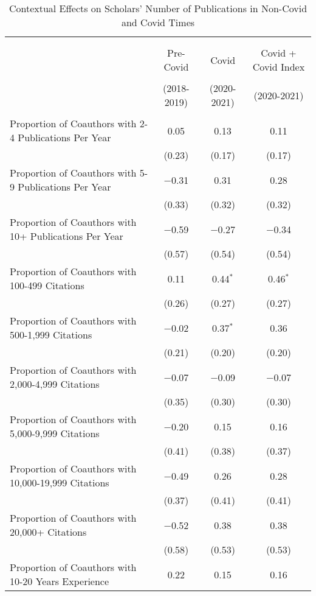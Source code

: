 \begin{table}[!htbp] \centering 
  \caption{Contextual Effects on Scholars' Number of Publications in Non-Covid and Covid Times} 
  \setlength\tabcolsep{1pt}
\begin{tabular}{lccc} 
\\[-1.8ex]\hline \hline \\[-1.8ex] 
\\[-1.8ex] & \multicolumn{1}{c}{Pre-Covid} & \multicolumn{1}{c}{Covid} & \multicolumn{1}{c}{Covid + Covid Index} \\ 
\\[-1.8ex] & (2018-2019) & (2020-2021) & (2020-2021) \\ 
\hline \\[-1.8ex]
  Proportion of Coauthors with 2-4 Publications Per Year & 0.05 & 0.13 & 0.11 \\ 
  & (0.23) & (0.17) & (0.17) \\
  Proportion of Coauthors with 5-9 Publications Per Year & $-$0.31 & 0.31 & 0.28 \\ 
  & (0.33) & (0.32) & (0.32) \\
  Proportion of Coauthors with 10+ Publications Per Year & $-$0.59 & $-$0.27 & $-$0.34 \\ 
  & (0.57) & (0.54) & (0.54) \\
  Proportion of Coauthors with 100-499 Citations & 0.11 & 0.44$^{*}$ & 0.46$^{*}$ \\ 
  & (0.26) & (0.27) & (0.27) \\
  Proportion of Coauthors with 500-1,999 Citations & $-$0.02 & 0.37$^{*}$ & 0.36 \\ 
  & (0.21) & (0.20) & (0.20) \\
  Proportion of Coauthors with 2,000-4,999 Citations & $-$0.07 & $-$0.09 & $-$0.07 \\ 
  & (0.35) & (0.30) & (0.30) \\
  Proportion of Coauthors with 5,000-9,999 Citations & $-$0.20 & 0.15 & 0.16 \\ 
  & (0.41) & (0.38) & (0.37) \\
  Proportion of Coauthors with 10,000-19,999 Citations & $-$0.49 & 0.26 & 0.28 \\ 
  & (0.37) & (0.41) & (0.41) \\
  Proportion of Coauthors with 20,000+ Citations & $-$0.52 & 0.38 & 0.38 \\ 
  & (0.58) & (0.53) & (0.53) \\
  Proportion of Coauthors with 10-20 Years Experience & 0.22 & 0.15 & 0.16 \\ 

\end{tabular}
\end{table}
